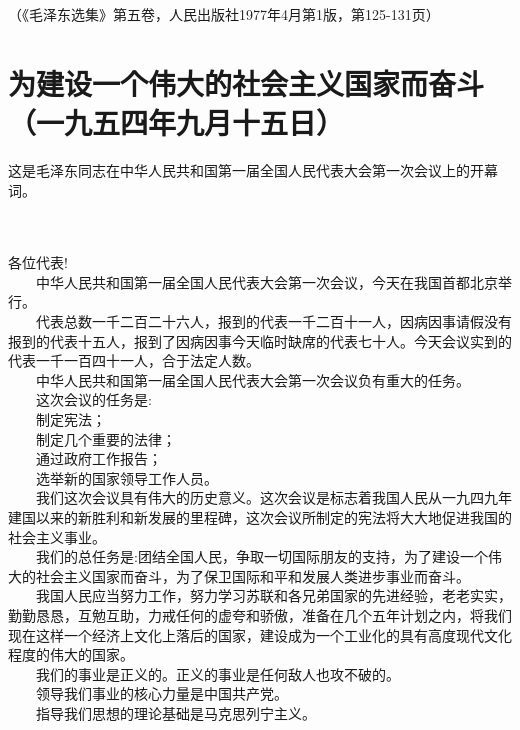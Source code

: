 \documentclass[cn,11pt,chinese]{elegantbook}
\def\myformat#1{\hfil\hfil #1}
\begin{document}
\begin{flushright}（《毛泽东选集》第五卷，人民出版社1977年4月第1版，第125-131页）\end{flushright}
\newpage\section*{\myformat{为建设一个伟大的社会主义国家而奋斗}\\\myformat{（一九五四年九月十五日）}}
\begin{introduction}\item  这是毛泽东同志在中华人民共和国第一届全国人民代表大会第一次会议上的开幕词。\end{introduction}\\~~\\
各位代表!\\
　　中华人民共和国第一届全国人民代表大会第一次会议，今天在我国首都北京举行。\\
　　代表总数一千二百二十六人，报到的代表一千二百十一人，因病因事请假没有报到的代表十五人，报到了因病因事今天临时缺席的代表七十人。今天会议实到的代表一千一百四十一人，合于法定人数。\\
　　中华人民共和国第一届全国人民代表大会第一次会议负有重大的任务。\\
　　这次会议的任务是:\\
　　制定宪法；\\
　　制定几个重要的法律；\\
　　通过政府工作报告；\\
　　选举新的国家领导工作人员。\\
　　我们这次会议具有伟大的历史意义。这次会议是标志着我国人民从一九四九年建国以来的新胜利和新发展的里程碑，这次会议所制定的宪法将大大地促进我国的社会主义事业。\\
　　我们的总任务是:团结全国人民，争取一切国际朋友的支持，为了建设一个伟大的社会主义国家而奋斗，为了保卫国际和平和发展人类进步事业而奋斗。\\
　　我国人民应当努力工作，努力学习苏联和各兄弟国家的先进经验，老老实实，勤勤恳恳，互勉互助，力戒任何的虚夸和骄傲，准备在几个五年计划之内，将我们现在这样一个经济上文化上落后的国家，建设成为一个工业化的具有高度现代文化程度的伟大的国家。\\
　　我们的事业是正义的。正义的事业是任何敌人也攻不破的。\\
　　领导我们事业的核心力量是中国共产党。\\
　　指导我们思想的理论基础是马克思列宁主义。\\
\end{document}
